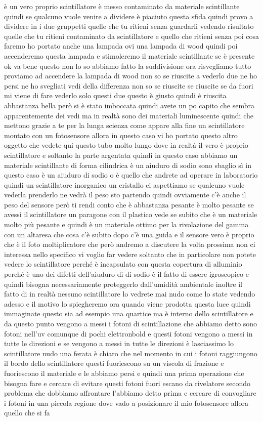 è un vero proprio scintillatore è messo contaminato da materiale scintillante quindi se qualcuno vuole venire a dividere è piaciuto questa sfida quindi provo a dividere in i due gruppetti quelle che tu ritieni senza guardarli vedendo risultato quelle che tu ritieni contaminato da scintillatore e quello che ritieni senza poi cosa faremo ho portato anche una lampada ovi una lampada di wood quindi poi accenderemo questa lampada e stimoleremo il materiale scintillante se è presente ok va bene questo non lo so abbiamo fatto la suddivisione ora risvegliamo tutto proviamo ad accendere la lampada di wood non so se riuscite a vederlo due ne ho persi ne ho svegliati vedi della differenza non so se riuscite se riuscite se da fuori mi viene di fare vederlo solo questi due questo è giusto quindi è riuscita abbastanza bella però si è stato imboccata quindi avete un po capito che sembra apparentemente dei vedi ma in realtà sono dei materiali luminescente quindi che mettono grazie a te per la lunga scienza come appare alla fine un scintillatore montato con un fotosensore allora in questo caso vi ho portato questo altro oggetto che vedete qui questo tubo molto lungo dove in realtà il vero è proprio scintillatore e soltanto la parte argentata quindi in questo caso abbiamo un materiale scintillante di forma cilindrica è un aiuduro di sodio sono sbaglio sì in questo caso è un aiuduro di sodio o è quello che andrete ad operare in laboratorio quindi un scintillatore inorganico un cristallo ci aspettiamo se qualcuno vuole vederla prenderlo ne vedrà il peso sto partendo quindi ovviamente c'è anche il peso del sensore però ti rendi conto che è abbastanza pesante è molto pesante se avessi il scintillatore un paragone con il plastico vede se subito che è un materiale molto più pesante e quindi è un materiale ottimo per la rivolazione del gamma con un altaresa che cosa c'è subito dopo c'è una guida e il sensore vero è proprio che è il foto moltiplicatore che però andremo a discutere la volta prossima non ci interessa nello specifico vi voglio far vedere soltanto che in particolare non potete vedere lo scintillatore perché è incapsulato con questa copertura di alluminio perché è uno dei difetti dell'aiuduro di di sodio è il fatto di essere igroscopico e quindi bisogna necessariamente proteggerlo dall'umidità ambientale inoltre il fatto di in realtà nessuno scintillatore lo vedrete mai nudo come lo state vedendo adesso e il motivo lo spiegheremo ora quando viene prodotta questa luce quindi immaginate questo sia ad esempio una quartice ma è interno dello scintillatore e da questo punto vengono a messi i fotoni di scintillazione che abbiamo detto sono fotoni nell'uv comunque di pochi elettronbold e questi fotoni vengono a messi in tutte le direzioni e se vengono a messi in tutte le direzioni è lasciassimo lo scintillatore nudo una ferata è chiaro che nel momento in cui i fotoni raggiungono il bordo dello scintillatore questi fuoriescono su un viscola di frazione e fuoriescono il materiale e le abbiamo persi e quindi una prima operazione che bisogna fare e cercare di evitare questi fotoni fuori escano da rivelatore secondo problema che dobbiamo affrontare l'abbiamo detto prima e cercare di convogliare i fotoni in una piccola regione dove vado a posizionare il mio fotosensore allora quello che si fa 